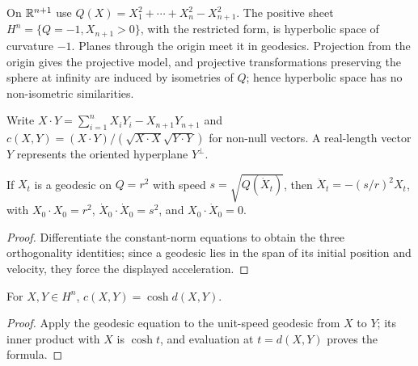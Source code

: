 \begin{definition}
\label{thurston-ch02-hyperboloid}
On $\mathbb{R}^{n+1}$ use $Q(X)=X_1^2+\cdots+X_n^2-X_{n+1}^2$. The positive sheet $H^n=\{Q=-1,X_{n+1}>0\}$, with the restricted form, is hyperbolic space of curvature $-1$. Planes through the origin meet it in geodesics. Projection from the origin gives the projective model, and projective transformations preserving the sphere at infinity are induced by isometries of $Q$; hence hyperbolic space has no non-isometric similarities.
\end{definition}

\begin{notation}
\label{thurston-ch02-lorentzian-cosine}
Write $X\cdot Y=\sum_{i=1}^nX_iY_i-X_{n+1}Y_{n+1}$ and $c(X,Y)=(X\cdot Y)/(\sqrt{X\cdot X}\sqrt{Y\cdot Y})$ for non-null vectors. A real-length vector $Y$ represents the oriented hyperplane $Y^\perp$.
\end{notation}

\begin{proposition}
\label{thurston-ch02-geodesic-equation}
If $X_t$ is a geodesic on $Q=r^2$ with speed $s=\sqrt{Q(\dot X_t)}$, then $\ddot X_t=-(s/r)^2X_t$, with $X_0\cdot X_0=r^2$, $\dot X_0\cdot\dot X_0=s^2$, and $X_0\cdot\dot X_0=0$.
\end{proposition}
\begin{proof}\sketch Differentiate the constant-norm equations to obtain the three orthogonality identities; since a geodesic lies in the span of its initial position and velocity, they force the displayed acceleration.\end{proof}

\begin{theorem}
\label{thurston-ch02-cosh-distance}
For $X,Y\in H^n$, $c(X,Y)=\cosh d(X,Y)$.
\end{theorem}
\begin{proof}\sketch Apply the geodesic equation to the unit-speed geodesic from $X$ to $Y$; its inner product with $X$ is $\cosh t$, and evaluation at $t=d(X,Y)$ proves the formula.\end{proof}

